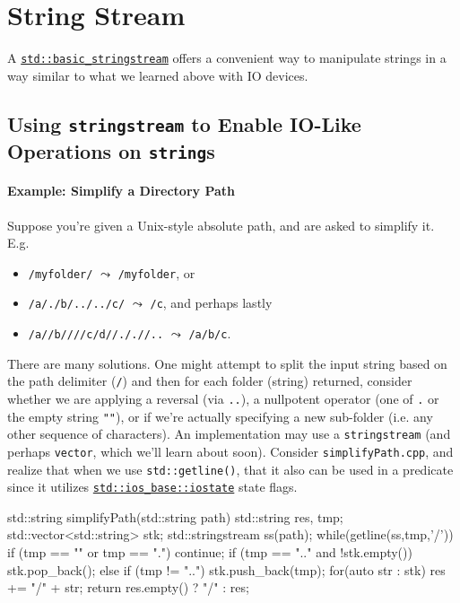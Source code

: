 \documentclass[12pt,letterpaper,twoside]{article}
\begin{document}
\section{String Stream}
A \href{https://en.cppreference.com/w/cpp/io/basic_stringstream}
{\texttt{std::basic\_stringstream}} offers a convenient way to manipulate strings in a way similar to what we learned above with IO devices.

\subsection{Using \texttt{stringstream} to Enable IO-Like Operations on \texttt{string}s}
\paragraph{Example: Simplify a Directory Path} Suppose you're given a Unix-style absolute path, and are asked to simplify it. E.g. 
\begin{itemize} 
  \item \texttt{/myfolder/} $\leadsto$ \texttt{/myfolder}, or
  \item \texttt{/a/./b/../../c/} $\leadsto$ \texttt{/c}, and perhaps lastly 
  \item \texttt{/a//b////c/d//././/..} $\leadsto$ \texttt{/a/b/c}.   
\end{itemize}

There are many solutions. One might attempt to split the input string 
based on the path delimiter (\texttt{/}) and then for each 
folder (string) returned, consider whether we are applying a 
reversal (via \texttt{..}), a nullpotent operator (one of \texttt{.} or the empty string  \texttt{""}), or 
if we're actually specifying a new sub-folder (i.e. any other sequence of characters). An implementation may use a \texttt{stringstream} (and perhaps 
\texttt{vector}, which we'll learn about soon). Consider \texttt{simplifyPath.cpp},
and realize that when we use \texttt{std::getline()}, that it also can be used in a predicate
since it utilizes 
\href{https://en.cppreference.com/w/cpp/io/ios_base/iostate}{\texttt{std::ios\_base::iostate}} 
state flags.

\begin{cpp}
std::string simplifyPath(std::string path) {
  std::string res, tmp;     
  std::vector<std::string> stk;    
  std::stringstream ss(path);     
  while(getline(ss,tmp,'/')) {         
    if (tmp == "" or tmp == ".")      continue;         
    if (tmp == ".." and !stk.empty()) stk.pop_back();         
    else if (tmp != "..")             stk.push_back(tmp);    
  }     
  for(auto str : stk) res += "/" + str;     
  return res.empty() ? "/" : res; 
}
\end{cpp}
\end{document}
